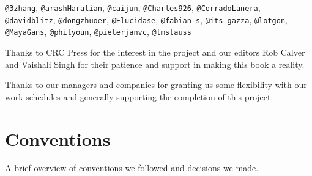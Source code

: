 \documentclass[
]{krantz}
\begin{document}
\texttt{@3zhang}, \texttt{@arashHaratian}, \texttt{@caijun}, \texttt{@Charles926}, \texttt{@CorradoLanera}, \texttt{@davidblitz}, \texttt{@dongzhuoer}, \texttt{@Elucidase}, \texttt{@fabian-s}, \texttt{@its-gazza}, \texttt{@lotgon}, \texttt{@MayaGans}, \texttt{@philyoun}, \texttt{@pieterjanvc}, \texttt{@tmstauss}

Thanks to CRC Press for the interest in the project and our editors Rob Calver and Vaishali Singh for their patience and support in making this book a reality.

Thanks to our managers and companies for granting us some flexibility with our work schedules and generally supporting the completion of this project.

\hypertarget{conventions}{%
\section{Conventions}\label{conventions}}

A brief overview of conventions we followed and decisions we made.
\end{document}
